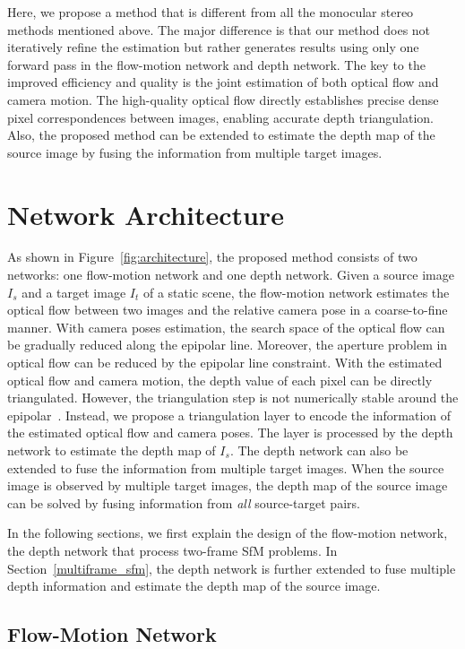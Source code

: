 \documentclass[letterpaper, 10 pt, conference]{ieeeconf}  %
\begin{document}
Here, we propose a method that is different from all the monocular stereo methods mentioned above. The major difference is that our method does not iteratively refine the estimation but rather generates results using only one forward pass in the flow-motion network and depth network. The key to the improved efficiency and quality is the joint estimation of both optical flow and camera motion. The high-quality optical flow directly establishes precise dense pixel correspondences between images, enabling accurate depth triangulation. Also, the proposed method can be extended to estimate the depth map of the source image by fusing the information from multiple target images.
 
\section{Network Architecture}
 
As shown in Figure~\ref{fig:architecture}, the proposed method consists of two networks: one flow-motion network and one depth network. Given a source image $I_{s}$ and a target image $I_{t}$ of a static scene, the flow-motion network estimates the optical flow between two images and the relative camera pose in a coarse-to-fine manner. With camera poses estimation, the search space of the optical flow can be gradually reduced along the epipolar line. Moreover, the aperture problem in optical flow can be reduced by the epipolar line constraint. With the estimated optical flow and camera motion, the depth value of each pixel can be directly triangulated. However, the triangulation step is not numerically stable around the epipolar~\cite{multiview_geometry}. Instead, we propose a triangulation layer to encode the information of the estimated optical flow and camera poses. The layer is processed by the depth network to estimate the depth map of $I_s$. The depth network can also be extended to fuse the information from multiple target images. When the source image is observed by multiple target images, the depth map of the source image can be solved by fusing information from \textit{all} source-target pairs.
 
In the following sections, we first explain the design of the flow-motion network, the depth network that process two-frame SfM problems. In Section~\ref{multiframe_sfm}, the depth network is further extended to fuse multiple depth information and estimate the depth map of the source image.
 
\subsection{Flow-Motion Network}\label{flow_motion_net}
 
\end{document}
